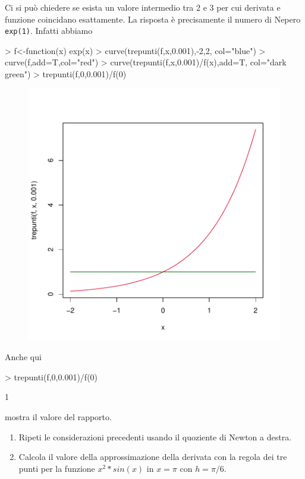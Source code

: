 \documentclass[onecolumn,11pt]{book}
\begin{document}
Ci si pu\`o chiedere se esista un valore intermedio tra 2 e 3 per cui derivata e funzione coincidano esattamente. La risposta \`e precisamente il numero di Nepero \texttt{exp(1)}. Infatti abbiamo
\begin{Schunk}
\begin{Sinput}
>  f<-function(x) exp(x)
>  curve(trepunti(f,x,0.001),-2,2, col="blue")
>  curve(f,add=T,col="red")
>  curve(trepunti(f,x,0.001)/f(x),add=T, col="dark green")
>  trepunti(f,0,0.001)/f(0)
\end{Sinput}
\end{Schunk}
\begin{figure}[ htbp]
\begin{center}
\includegraphics{statisticaconR-098}
\label{fig:grafexp}
\end{center}
\end{figure}

Anche qui
\begin{Schunk}
\begin{Sinput}
> trepunti(f,0,0.001)/f(0)
\end{Sinput}
\begin{Soutput}
[1] 1
\end{Soutput}
\end{Schunk}
mostra il valore del rapporto.

\begin{shaded}
\begin{enumerate}
 \item{ }Ripeti le considerazioni precedenti usando il quoziente di Newton a destra.
\item{} Calcola il valore della approssimazione della derivata con la regola dei tre punti per la funzione $x^2*sin(x)$ in $x=\pi$ con $h=\pi/6$.
\end{enumerate}
\end{shaded}  
\end{document}
